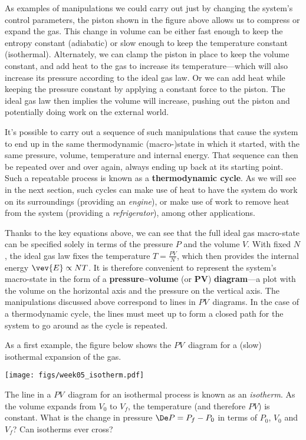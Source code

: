 As examples of manipulations we could carry out just by changing the system's control parameters, the piston shown in the figure above allows us to compress or expand the gas.
This change in volume can be either fast enough to keep the entropy constant (adiabatic) or slow enough to keep the temperature constant (isothermal).
Alternately, we can clamp the piston in place to keep the volume constant, and add heat to the gas to increase its temperature---which will also increase its pressure according to the ideal gas law.
Or we can add heat while keeping the pressure constant by applying a constant force to the piston.
The ideal gas law then implies the volume will increase, pushing out the piston and potentially doing work on the external world.

It's possible to carry out a sequence of such manipulations that cause the system to end up in the same thermodynamic (macro-)state in which it started, with the same pressure, volume, temperature and internal energy.
That sequence can then be repeated over and over again, always ending up back at its starting point.
Such a repeatable process is known as a \textbf{thermodynamic cycle}.
As we will see in the next section, such cycles can make use of heat to have the system do work on its surroundings (providing an \textit{engine}), or make use of work to remove heat from the system (providing a \textit{refrigerator}), among other applications.

Thanks to the key equations above, we can see that the full ideal gas macro-state can be specified solely in terms of the pressure $P$ and the volume $V$.
With fixed $N$, the ideal gas law fixes the temperature $T = \frac{PV}{N}$, which then provides the internal energy $\vev{E} \propto NT$.
It is therefore convenient to represent the system's macro-state in the form of a \textbf{pressure--volume} (or $\mathbf{PV}$) \textbf{diagram}---a plot with the volume on the horizontal axis and the pressure on the vertical axis.
The manipulations discussed above correspond to lines in $PV$~diagrams.
In the case of a thermodynamic cycle, the lines must meet up to form a closed path for the system to go around as the cycle is repeated.

As a first example, the figure below shows the $PV$~diagram for a (slow) isothermal expansion of the gas.
\begin{center}
  \texttt{[image: figs/week05\_isotherm.pdf]}
\end{center}
\newpage %
\noindent The line in a $PV$~diagram for an isothermal process is known as an \textit{isotherm}.
As the volume expands from $V_0$ to $V_f$, the temperature (and therefore $PV$) is constant.
What is the change in pressure $\De P = P_f - P_0$ in terms of $P_0$, $V_0$ and $V_f$?
Can isotherms ever cross?
\begin{mdframed}
  \ \\[100 pt]
\end{mdframed}

